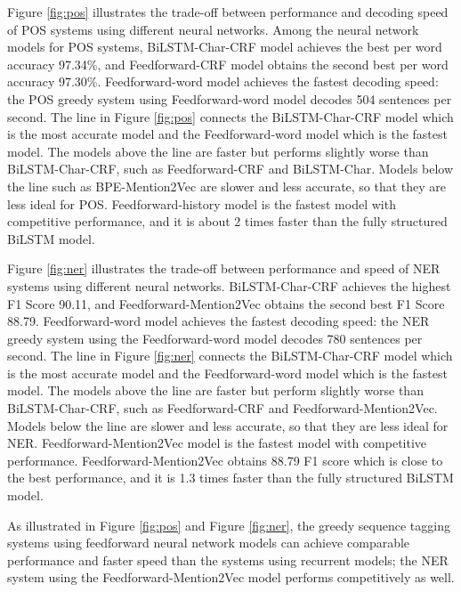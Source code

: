 \documentclass{sfuthesis}
\begin{document}
Figure \ref{fig:pos} illustrates the trade-off between performance and decoding speed of POS systems using different neural networks. Among the neural network models for POS systems, BiLSTM-Char-CRF model achieves the best per word accuracy 97.34\%, and Feedforward-CRF model obtains the second best per word accuracy 97.30\%. Feedforward-word model achieves the fastest decoding speed: the POS greedy system using Feedforward-word model decodes 504 sentences per second. The line in Figure \ref{fig:pos} connects the BiLSTM-Char-CRF model which is the most accurate model and the Feedforward-word model which is the fastest model. The models above the line are faster but performs slightly worse than BiLSTM-Char-CRF, such as Feedforward-CRF and BiLSTM-Char. Models below the line such as BPE-Mention2Vec are slower and less accurate, so that they are less ideal for POS. Feedforward-history model is the fastest model with competitive performance, and it is about 2 times faster than the fully structured BiLSTM model.

Figure \ref{fig:ner} illustrates the trade-off between performance and speed of NER systems using different neural networks. BiLSTM-Char-CRF achieves the highest F1 Score 90.11, and Feedforward-Mention2Vec obtains the second best F1 Score 88.79. Feedforward-word model achieves the fastest decoding speed: the NER greedy system using the Feedforward-word model decodes 780 sentences per second. The line in Figure \ref{fig:ner} connects the BiLSTM-Char-CRF model which is the most accurate model and the Feedforward-word model which is the fastest model. The models above the line are faster but perform slightly worse than BiLSTM-Char-CRF, such as Feedforward-CRF and Feedforward-Mention2Vec. Models below the line are slower and less accurate, so that they are less ideal for NER. Feedforward-Mention2Vec model is the fastest model with competitive performance. Feedforward-Mention2Vec obtains 88.79 F1 score which is close to the best performance, and it is 1.3 times faster than the fully structured BiLSTM model.

As illustrated in Figure \ref{fig:pos} and Figure \ref{fig:ner}, the greedy sequence tagging systems using feedforward neural network models can achieve comparable performance and faster speed than the systems using recurrent models; the NER system using the Feedforward-Mention2Vec model performs competitively as well.
\end{document}
